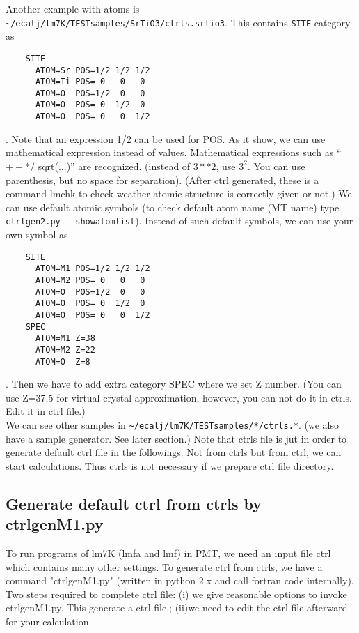 \documentclass[a4paper,10pt,epsf,fleqn]{article}
\begin{document}
Another example with atoms is 
\verb+~/ecalj/lm7K/TESTsamples/SrTiO3/ctrls.srtio3+. This
contains \verb+SITE+ category as
\begin{verbatim}
    SITE
      ATOM=Sr POS=1/2 1/2 1/2
      ATOM=Ti POS= 0   0   0
      ATOM=O  POS=1/2  0   0
      ATOM=O  POS= 0  1/2  0
      ATOM=O  POS= 0   0  1/2
\end{verbatim}
. Note that an expression 1/2 can be used for POS. 
As it show, we can use mathematical expression instead of values.
Mathematical expressions such as ``$+ -  * /$ sqrt(...)'' are recognized.
(instead of $3**2$, use $3^2$. You can use parenthesis, but no space for separation).
(After ctrl generated, these is a command lmchk to check weather atomic
structure is correctly given or not.)
We can use default atomic symbols (to check default atom name (MT name) type \verb+ctrlgen2.py --showatomlist+).
Instead of such default symbols, we can use your own symbol as
\begin{verbatim}
    SITE
      ATOM=M1 POS=1/2 1/2 1/2
      ATOM=M2 POS= 0   0   0
      ATOM=O  POS=1/2  0   0
      ATOM=O  POS= 0  1/2  0
      ATOM=O  POS= 0   0  1/2
    SPEC
      ATOM=M1 Z=38
      ATOM=M2 Z=22
      ATOM=O  Z=8
\end{verbatim}
. Then we have to add extra category SPEC where we set Z number.
(You can use Z=37.5 for virtual crystal approximation, however, 
you can not do it in ctrls. Edit it in ctrl file.)\\

We can see other samples in \verb+~/ecalj/lm7K/TESTsamples/*/ctrls.*+.
(we also have a sample generator. See later section.)
Note that ctrls file is jut in order to generate default ctrl file in
the followings. Not from ctrls but from ctrl, we can start calculations.
Thus ctrls is not necessary if we prepare ctrl file directory.


\subsection{Generate default ctrl from ctrls by ctrlgenM1.py}
To run programs of lm7K (lmfa and lmf) in PMT,
we need an input file ctrl which contains many other settings.
To generate ctrl from ctrls, we have a command "ctrlgenM1.py" (written
in python 2.x and call fortran code internally).
Two steps required to complete ctrl file:
(i) we give reasonable options to invoke ctrlgenM1.py. 
This generate a ctrl file.;
(ii)we need to edit the ctrl file afterward for your calculation.
\end{document}
